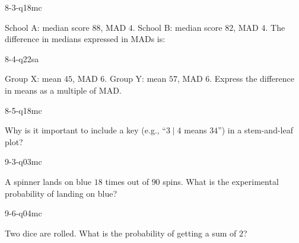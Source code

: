 \begin{practiceQuestion}{8-3-q18}{mc}
\begin{questionText}
School A: median score $88$, MAD $4$. School B: median score $82$, MAD $4$. The difference in medians expressed in MADs is:
\end{questionText}
\end{practiceQuestion}

\begin{practiceQuestion}{8-4-q22}{sa}
\begin{questionText}
Group X: mean $45$, MAD $6$. Group Y: mean $57$, MAD $6$. Express the difference in means as a multiple of MAD.
\end{questionText}
\end{practiceQuestion}

\begin{practiceQuestion}{8-5-q18}{mc}
\begin{questionText}
Why is it important to include a key (e.g., ``$3 \mid 4$ means $34$'') in a stem-and-leaf plot?
\end{questionText}
\end{practiceQuestion}

\begin{practiceQuestion}{9-3-q03}{mc}
\begin{questionText}
A spinner lands on blue $18$ times out of $90$ spins. What is the experimental probability of landing on blue?
\end{questionText}
\end{practiceQuestion}

\begin{practiceQuestion}{9-6-q04}{mc}
\begin{questionText}
Two dice are rolled. What is the probability of getting a sum of $2$?
\end{questionText}
\end{practiceQuestion}

